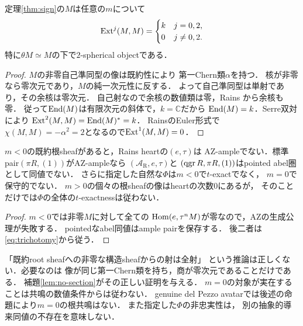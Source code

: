 \begin{proposition}
\label{prop:spherical}
定理\ref{thm:sign}の$M$は任意の$m$について
\[
\operatorname{Ext}^j(M,M)=
\begin{cases}k&j=0,2,\\0&j\ne0,2.\end{cases}
\]
特に$\theta M\simeq M$の下で$2$-spherical objectである．
\end{proposition}
\begin{proof}
$M$の非零自己準同型の像は既約性により
第一Chern類$\alpha$を持つ．
核が非零なら零次元であり，$M$の純一次元性に反する．
よって自己準同型は単射であり，その余核は零次元．
自己射なので余核の数値類は零，Rains
\cite[Proposition 7.6]{RainsBirational}から余核も零．
従って$\operatorname{End}(M)$は有限次元の斜体で，$k=\mathbb C$だから
$\operatorname{End}(M)=k$．Serre双対により
$\operatorname{Ext}^2(M,M)=\operatorname{End}(M)^*=k$．
Rains\cite[Corollary 7.13]{RainsBirational}のEuler形式で
$\chi(M,M)=-\alpha^2=2$となるので$\operatorname{Ext}^1(M,M)=0$．
\end{proof}

\begin{corollary}[pointedなheart非一致と導来切断の限界]
\label{cor:pointed-sign}
$m<0$の既約根sheafがあると，Rains heartの$(e,\tau)$は
AZ-ampleでない．標準pair$(\pi R,(1))$がAZ-ampleなら
$(\mathcal A_{\mathrm R},e,\tau)$と
$(\operatorname{qgr} R,\pi R,(1))$はpointed abel圏として同値でない．
さらに指定した自然な$\Phi$は$m<0$で$t$-exactでなく，
$m=0$で保守的でない．
$m>0$の個々の根sheafの像はheartの次数0にあるが，
そのことだけでは$\Phi$の全体の$t$-exactnessは従わない．
\end{corollary}
\begin{proof}
$m<0$では非零$M$に対して全ての
$\operatorname{Hom}(e,\tau^nM)$が零なので，AZの生成公理が失敗する．
pointedなabel同値はample pairを保存する．
後二者は\eqref{eq:trichotomy}から従う．
\end{proof}
\begin{remark}[先行する証明の訂正と範囲]
「既約root sheafへの非零な構造sheafからの射は全射」
という推論は正しくない．必要なのは
像が同じ第一Chern類を持ち，商が零次元であることだけである．
補題\ref{lem:no-section}がその正しい証明を与える．
$m=0$の対象が実在することは共鳴の数値条件からは従わない．
genuine del Pezzo avatarでは後述の命題により$m=0$の根共鳴はない．
また指定した$\Phi$の非忠実性は，
別の抽象的導来同値の不存在を意味しない．
\end{remark}
